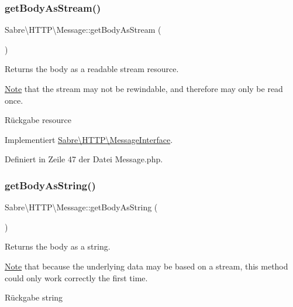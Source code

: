\subsubsection{\texorpdfstring{get\+Body\+As\+Stream()}{getBodyAsStream()}}
{\footnotesize\ttfamily Sabre\textbackslash{}\+H\+T\+T\+P\textbackslash{}\+Message\+::get\+Body\+As\+Stream (\begin{DoxyParamCaption}{ }\end{DoxyParamCaption})}

Returns the body as a readable stream resource.

\mbox{\hyperlink{class_note}{Note}} that the stream may not be rewindable, and therefore may only be read once.

\begin{DoxyReturn}{Rückgabe}
resource 
\end{DoxyReturn}


Implementiert \mbox{\hyperlink{interface_sabre_1_1_h_t_t_p_1_1_message_interface_a8f6211306846a4789498647c03d02442}{Sabre\textbackslash{}\+H\+T\+T\+P\textbackslash{}\+Message\+Interface}}.



Definiert in Zeile 47 der Datei Message.\+php.

\mbox{\label{class_sabre_1_1_h_t_t_p_1_1_message_aa6a73aa5da947ec18adcf254abb4c0ef}} 
\subsubsection{\texorpdfstring{get\+Body\+As\+String()}{getBodyAsString()}}
{\footnotesize\ttfamily Sabre\textbackslash{}\+H\+T\+T\+P\textbackslash{}\+Message\+::get\+Body\+As\+String (\begin{DoxyParamCaption}{ }\end{DoxyParamCaption})}

Returns the body as a string.

\mbox{\hyperlink{class_note}{Note}} that because the underlying data may be based on a stream, this method could only work correctly the first time.

\begin{DoxyReturn}{Rückgabe}
string 
\end{DoxyReturn}


